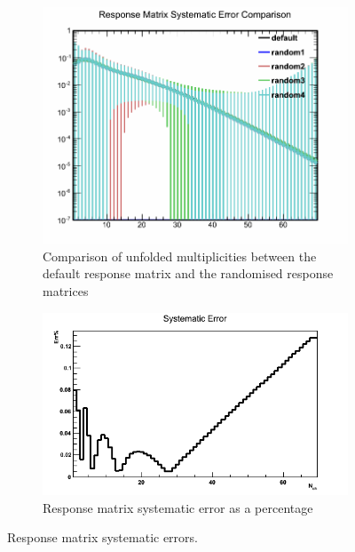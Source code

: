 \begin{figure}[h]
	\begin{subfigure}{0.49\textwidth}
		\includegraphics[width=\textwidth]{Chapters/multiplicity/charged_particle_event_multiplicity/images/systematics/random_response_matrix_overlay.png}
		\caption{Comparison of unfolded multiplicities between the default response matrix and the randomised response matrices}
		\label{fig: comparison random response matrices}
	\end{subfigure}
	\begin{subfigure}{0.49\textwidth}
		\includegraphics[width=\textwidth]{Chapters/multiplicity/charged_particle_event_multiplicity/images/systematics/random_response_matrix_systematic.png}
		\caption{Response matrix systematic error as a percentage}
		\label{fig: response matrix systematic}
	\end{subfigure}
	\caption{Response matrix systematic errors.}
	\label{fig: response matrix systematic errors}
\end{figure}

